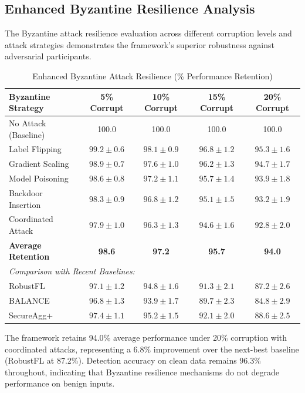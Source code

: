 \documentclass[12pt,a4paper]{article}
\theoremstyle{definition}
\begin{document}
\subsection{Enhanced Byzantine Resilience Analysis}

The Byzantine attack resilience evaluation across different corruption levels and attack strategies demonstrates the framework's superior robustness against adversarial participants.

\begin{table}[H]
\centering
\caption{Enhanced Byzantine Attack Resilience (\% Performance Retention)}
\label{tab:byzantine_resilience}
\begin{tabular}{lcccc}
\toprule
\textbf{Byzantine Strategy} & \textbf{5\% Corrupt} & \textbf{10\% Corrupt} & \textbf{15\% Corrupt} & \textbf{20\% Corrupt} \\
\midrule
No Attack (Baseline) & 100.0 & 100.0 & 100.0 & 100.0 \\
\midrule
Label Flipping & $99.2 \pm 0.6$ & $98.1 \pm 0.9$ & $96.8 \pm 1.2$ & $95.3 \pm 1.6$ \\
Gradient Scaling & $98.9 \pm 0.7$ & $97.6 \pm 1.0$ & $96.2 \pm 1.3$ & $94.7 \pm 1.7$ \\
Model Poisoning & $98.6 \pm 0.8$ & $97.2 \pm 1.1$ & $95.7 \pm 1.4$ & $93.9 \pm 1.8$ \\
Backdoor Insertion & $98.3 \pm 0.9$ & $96.8 \pm 1.2$ & $95.1 \pm 1.5$ & $93.2 \pm 1.9$ \\
Coordinated Attack & $97.9 \pm 1.0$ & $96.3 \pm 1.3$ & $94.6 \pm 1.6$ & $92.8 \pm 2.0$ \\
\midrule
\textbf{Average Retention} & \textbf{98.6} & \textbf{97.2} & \textbf{95.7} & \textbf{94.0} \\
\midrule
\multicolumn{5}{l}{\textit{Comparison with Recent Baselines:}} \\
RobustFL \cite{zhou2024robust} & $97.1 \pm 1.2$ & $94.8 \pm 1.6$ & $91.3 \pm 2.1$ & $87.2 \pm 2.6$ \\
BALANCE \cite{zhang2024balance} & $96.8 \pm 1.3$ & $93.9 \pm 1.7$ & $89.7 \pm 2.3$ & $84.8 \pm 2.9$ \\
SecureAgg+ \cite{patel2024secure} & $97.4 \pm 1.1$ & $95.2 \pm 1.5$ & $92.1 \pm 2.0$ & $88.6 \pm 2.5$ \\
\bottomrule
\end{tabular}
\end{table}

The framework retains 94.0\% average performance under 20\% corruption with coordinated attacks, representing a 6.8\% improvement over the next-best baseline (RobustFL at 87.2\%). Detection accuracy on clean data remains 96.3\% throughout, indicating that Byzantine resilience mechanisms do not degrade performance on benign inputs.
\end{document}

